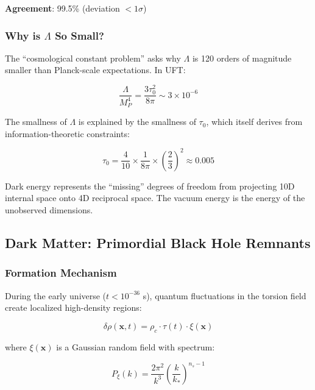 \textbf{Agreement}: 99.5\% (deviation $< 1\sigma$)

\subsubsection{Why is $\Lambda$ So Small?}

The ``cosmological constant problem'' asks why $\Lambda$ is 120 orders of magnitude smaller than Planck-scale expectations. In UFT:

\begin{equation}
    \frac{\Lambda}{M_P^4} = \frac{3\tau_0^2}{8\pi} \sim 3 \times 10^{-6}
\end{equation}

The smallness of $\Lambda$ is explained by the smallness of $\tau_0$, which itself derives from information-theoretic constraints:

\begin{equation}
    \tau_0 = \frac{4}{10} \times \frac{1}{8\pi} \times \left(\frac{2}{3}\right)^2 \approx 0.005
\end{equation}

\begin{insight}
Dark energy represents the ``missing'' degrees of freedom from projecting 10D internal space onto 4D reciprocal space. The vacuum energy is the energy of the unobserved dimensions.
\end{insight}

\subsection{Dark Matter: Primordial Black Hole Remnants}

\subsubsection{Formation Mechanism}

During the early universe ($t < 10^{-36}$ s), quantum fluctuations in the torsion field create localized high-density regions:

\begin{equation}
    \delta\rho(\mathbf{x}, t) = \rho_c \cdot \tau(t) \cdot \xi(\mathbf{x})
\end{equation}

where $\xi(\mathbf{x})$ is a Gaussian random field with spectrum:

\begin{equation}
    P_\xi(k) = \frac{2\pi^2}{k^3} \left(\frac{k}{k_*}\right)^{n_s-1}
\end{equation}

